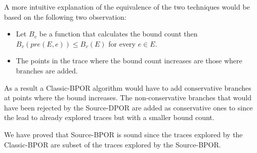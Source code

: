A more intuitive explanation of the equivalence of the two techniques would be based on the following two observation:
\begin{itemize}
  \item Let $B_v$ be a function that calculates the bound count then $B_v(pre(E,e)) \leq B_v(E)$ for every $e \in E$.
  \item The points in the trace where the bound count increases are those where branches are added.
\end{itemize}

As a result a Classic-BPOR algorithm would have to add conservative branches at points where the bound increases. The
non-conservative branches that would have been rejected by the Source-DPOR are added as conservative ones to since the
lead to already explored traces but with a smaller bound count.

We have proved that Source-BPOR is sound since the traces explored by the Classic-BPOR are subset of the traces explored
by the Source-BPOR.
